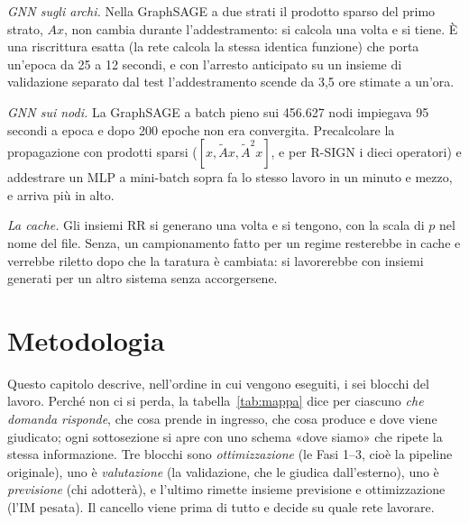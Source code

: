 \documentclass[11pt,a4paper]{article}
\begin{document}
\emph{GNN sugli archi.} Nella GraphSAGE a due strati il prodotto sparso del primo strato, $A x$, non cambia durante l'addestramento: si calcola una volta e si tiene. È una riscrittura esatta (la rete calcola la stessa identica funzione) che porta un'epoca da 25 a 12 secondi, e con l'arresto anticipato su un insieme di validazione separato dal test l'addestramento scende da 3,5 ore stimate a un'ora.

\emph{GNN sui nodi.} La GraphSAGE a batch pieno sui 456.627 nodi impiegava 95 secondi a epoca e dopo 200 epoche non era convergita. Precalcolare la propagazione con prodotti sparsi ($[x, \tilde{A}x, \tilde{A}^2 x]$, e per R-SIGN i dieci operatori) e addestrare un MLP a mini-batch sopra fa lo stesso lavoro in un minuto e mezzo, e arriva più in alto.

\emph{La cache.} Gli insiemi RR si generano una volta e si tengono, con la scala di $p$ nel nome del file. Senza, un campionamento fatto per un regime resterebbe in cache e verrebbe riletto dopo che la taratura è cambiata: si lavorerebbe con insiemi generati per un altro sistema senza accorgersene.

\clearpage
\section{Metodologia}
\label{sec:metodo}

Questo capitolo descrive, nell'ordine in cui vengono eseguiti, i sei blocchi del lavoro. Perché non ci si perda, la tabella~\ref{tab:mappa} dice per ciascuno \emph{che domanda risponde}, che cosa prende in ingresso, che cosa produce e dove viene giudicato; ogni sottosezione si apre con uno schema «dove siamo» che ripete la stessa informazione. Tre blocchi sono \emph{ottimizzazione} (le Fasi 1--3, cioè la pipeline originale), uno è \emph{valutazione} (la validazione, che le giudica dall'esterno), uno è \emph{previsione} (chi adotterà), e l'ultimo rimette insieme previsione e ottimizzazione (l'IM pesata). Il cancello viene prima di tutto e decide su quale rete lavorare.
\end{document}

